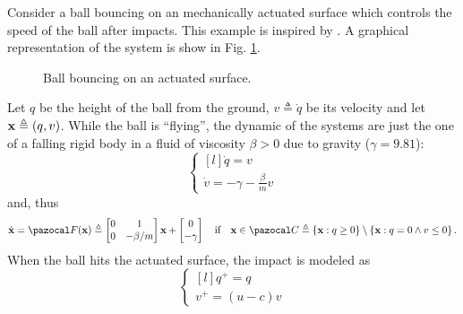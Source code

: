 \begin{exmp}
    Consider a ball bouncing on an mechanically actuated surface which controls the speed of the ball after impacts. This example is inspired by \citep{naldi2013passivity}. A graphical representation of the system is show in Fig. \ref{fig:bb}.
    \begin{figure}[h]
        \centering
        
        \caption[Ball bouncing on an actuated surface]{Ball bouncing on an actuated surface.}
        \label{fig:bb}
    \end{figure}
    Let $q$ be the height of the ball from the ground, $v\triangleq\dot{q}$ be its velocity and let $\mathbf{x}\triangleq(q,v)$. While the ball is ``flying'', the dynamic of the systems are just the one of a falling rigid body in a fluid of viscosity $\beta>0$ due to gravity ($\gamma=9.81$):
    \begin{equation}
        \left\{
            \begin{matrix*}[l]
                \dot{q} = v\\
                \dot{v} = -\gamma-\frac{\beta}{m}v
            \end{matrix*}
        \right.
    \end{equation}
    and, thus
    \begin{equation}
        \dot{\xb} = \F(\xb)\triangleq
        \begin{bmatrix}
            0&1\\
            0&-\beta/m
        \end{bmatrix}\xb + 
        \begin{bmatrix}
            0\\
            -\gamma
        \end{bmatrix}
        \quad \text{if}\quad \xb\in\C\triangleq\left\{\xb:q\geq 0\right\}\setminus\left\{\xb:q=0\land v\leq 0\right\}.
    \end{equation}
    When the ball hits the actuated surface, the impact is modeled as
    \begin{equation}
        \left\{
            \begin{matrix*}[l]
                q^+ = q\\
                v^+ = (u-c)v
            \end{matrix*}

\end{equation}
\end{exmp}
